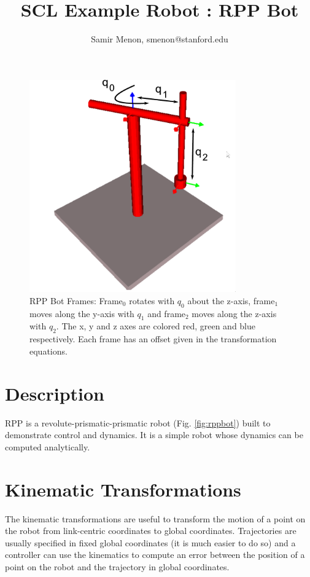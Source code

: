 \documentclass[12pt]{article}
\title{SCL Example Robot : RPP Bot}
\author{Samir Menon, smenon@stanford.edu}
\begin{document}
\maketitle


\begin{figure}[ht!]
\begin{center}
\includegraphics[width=3.5in]{figs/rpp2.pdf}
\caption{RPP Bot Frames: Frame$_0$ rotates with $q_0$ about the z-axis, frame$_1$ moves along the y-axis 
with $q_1$ and frame$_2$ moves along the z-axis with $q_2$. The x, y and z axes are colored red, green 
and blue respectively. Each frame has an offset given in the transformation equations.}
\label{fig:rppframes}
\end{center}
\end{figure}


\section{Description}
RPP is a revolute-prismatic-prismatic robot (Fig. \ref{fig:rppbot}) built to
demonstrate control and dynamics. It is a simple robot whose dynamics can be
computed analytically.

\section{Kinematic Transformations}
The kinematic transformations are useful to transform the motion of a point on the robot
from link-centric coordinates to global coordinates. Trajectories are usually specified in
fixed global coordinates (it is much easier to do so) and a controller can use the kinematics to
compute an error between the position of a point on the robot and the trajectory in global
coordinates.
\end{document}
